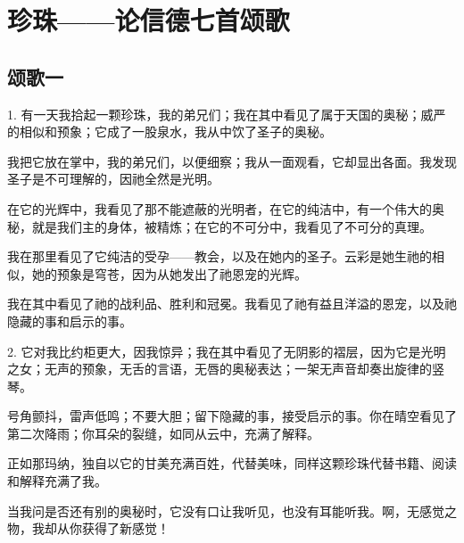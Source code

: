
\chapter{珍珠——论信德七首颂歌}



\section{颂歌一}

1. 有一天我拾起一颗珍珠，我的弟兄们；我在其中看见了属于天国的奥秘；威严的相似和预象；它成了一股泉水，我从中饮了圣子的奥秘。\par

我把它放在掌中，我的弟兄们，以便细察；我从一面观看，它却显出各面。我发现圣子是不可理解的，因祂全然是光明。\par

在它的光辉中，我看见了那不能遮蔽的光明者，在它的纯洁中，有一个伟大的奥秘，就是我们主的身体，被精炼；在它的不可分中，我看见了不可分的真理。\par

我在那里看见了它纯洁的受孕——教会，以及在她内的圣子。云彩是她生祂的相似，她的预象是穹苍，因为从她发出了祂恩宠的光辉。\par

我在其中看见了祂的战利品、胜利和冠冕。我看见了祂有益且洋溢的恩宠，以及祂隐藏的事和启示的事。\par

2. 它对我比约柜更大，因我惊异；我在其中看见了无阴影的褶层，因为它是光明之女；无声的预象，无舌的言语，无唇的奥秘表达；一架无声音却奏出旋律的竖琴。\par

号角颤抖，雷声低鸣；不要大胆；留下隐藏的事，接受启示的事。你在晴空看见了第二次降雨；你耳朵的裂缝，如同从云中，充满了解释。\par

正如那玛纳，独自以它的甘美充满百姓，代替美味，同样这颗珍珠代替书籍、阅读和解释充满了我。\par

当我问是否还有别的奥秘时，它没有口让我听见，也没有耳能听我。啊，无感觉之物，我却从你获得了新感觉！\par

